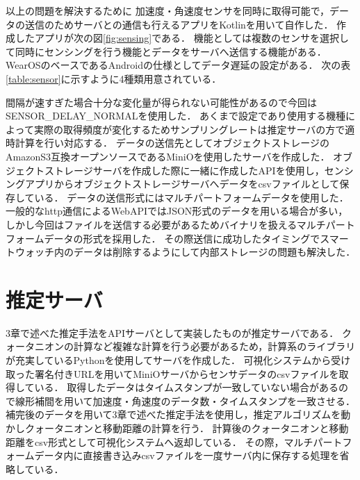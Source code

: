 以上の問題を解決するために
加速度・角速度センサを同時に取得可能で，データの送信のためサーバとの通信も行えるアプリをKotlinを用いて自作した．
作成したアプリが次の図\ref{fig:sensing}である．
機能としては複数のセンサを選択して同時にセンシングを行う機能とデータをサーバへ送信する機能がある．
WearOSのベースであるAndroidの仕様としてデータ遅延の設定がある．
次の表\ref{table:sensor}に示すように4種類用意されている．
\begin{table}[ht]
    \centering
    \caption{センサのデータ遅延設定}
    \label{table:sensor}
\end{table}
間隔が速すぎた場合十分な変化量が得られない可能性があるので今回はSENSOR\_DELAY\_NORMALを使用した．
あくまで設定であり使用する機種によって実際の取得頻度が変化するためサンプリングレートは推定サーバの方で適時計算を行い対応する．
データの送信先としてオブジェクトストレージのAmazonS3互換オープンソースであるMiniOを使用したサーバを作成した．
オブジェクトストレージサーバを作成した際に一緒に作成したAPIを使用し，センシングアプリからオブジェクトストレージサーバへデータをcsvファイルとして保存している．
データの送信形式にはマルチパートフォームデータを使用した．
一般的なhttp通信によるWebAPIではJSON形式のデータを用いる場合が多い，しかし今回はファイルを送信する必要があるためバイナリを扱えるマルチパートフォームデータの形式を採用した．
その際送信に成功したタイミングでスマートウォッチ内のデータは削除するようにして内部ストレージの問題も解決した．

\section{推定サーバ}
3章で述べた推定手法をAPIサーバとして実装したものが推定サーバである．
クォータニオンの計算など複雑な計算を行う必要があるため，計算系のライブラリが充実しているPythonを使用してサーバを作成した．
可視化システムから受け取った署名付きURLを用いてMiniOサーバからセンサデータのcsvファイルを取得している．
取得したデータはタイムスタンプが一致していない場合があるので線形補間を用いて加速度・角速度のデータ数・タイムスタンプを一致させる．
補完後のデータを用いて3章で述べた推定手法を使用し，推定アルゴリズムを動かしクォータニオンと移動距離の計算を行う．
計算後のクォータニオンと移動距離をcsv形式として可視化システムへ返却している．
その際，マルチパートフォームデータ内に直接書き込みcsvファイルを一度サーバ内に保存する処理を省略している．

